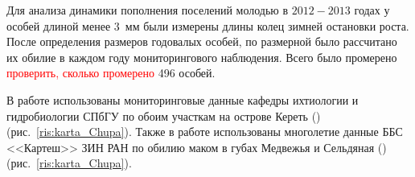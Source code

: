 Для анализа динамики пополнения поселений молодью в $2012 - 2013$ годах у особей длиной менее $3$~мм были измерены длины колец зимней остановки роста. 
После определения размеров годовалых особей, по размерной было рассчитано их обилие в каждом году мониторингового наблюдения.
Всего было промерено \textcolor{red}{проверить, сколько промерено} 496 особей.



В работе использованы мониторинговые данные кафедры ихтиологии и гидробиологии СПбГУ по обоим участкам на острове Кереть (\cite{Maximovich_et_al_1991, Gerasimova_Maximovich_2013}) (рис.~\ref{ris:karta_Chupa}). 
Также в работе использованы многолетие данные ББС <<Картеш>> ЗИН РАН по обилию маком в губах Медвежья и Сельдяная (\cite{Varfolomeeva_Naumov_2013}) (рис.~\ref{ris:karta_Chupa}).


 





